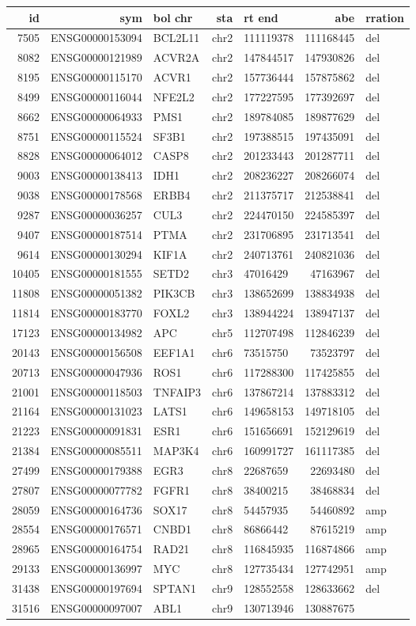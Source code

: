 \documentclass[]{article}
\begin{document}
\begin{longtable}[]{@{}rrlrlrl@{}}
\toprule
id & sym & bol chr & sta & rt end & abe & rration\tabularnewline
\midrule
\endhead
7505 & ENSG00000153094 & BCL2L11 & chr2 & 111119378 & 111168445 &
del\tabularnewline
8082 & ENSG00000121989 & ACVR2A & chr2 & 147844517 & 147930826 &
del\tabularnewline
8195 & ENSG00000115170 & ACVR1 & chr2 & 157736444 & 157875862 &
del\tabularnewline
8499 & ENSG00000116044 & NFE2L2 & chr2 & 177227595 & 177392697 &
del\tabularnewline
8662 & ENSG00000064933 & PMS1 & chr2 & 189784085 & 189877629 &
del\tabularnewline
8751 & ENSG00000115524 & SF3B1 & chr2 & 197388515 & 197435091 &
del\tabularnewline
8828 & ENSG00000064012 & CASP8 & chr2 & 201233443 & 201287711 &
del\tabularnewline
9003 & ENSG00000138413 & IDH1 & chr2 & 208236227 & 208266074 &
del\tabularnewline
9038 & ENSG00000178568 & ERBB4 & chr2 & 211375717 & 212538841 &
del\tabularnewline
9287 & ENSG00000036257 & CUL3 & chr2 & 224470150 & 224585397 &
del\tabularnewline
9407 & ENSG00000187514 & PTMA & chr2 & 231706895 & 231713541 &
del\tabularnewline
9614 & ENSG00000130294 & KIF1A & chr2 & 240713761 & 240821036 &
del\tabularnewline
10405 & ENSG00000181555 & SETD2 & chr3 & 47016429 & 47163967 &
del\tabularnewline
11808 & ENSG00000051382 & PIK3CB & chr3 & 138652699 & 138834938 &
del\tabularnewline
11814 & ENSG00000183770 & FOXL2 & chr3 & 138944224 & 138947137 &
del\tabularnewline
17123 & ENSG00000134982 & APC & chr5 & 112707498 & 112846239 &
del\tabularnewline
20143 & ENSG00000156508 & EEF1A1 & chr6 & 73515750 & 73523797 &
del\tabularnewline
20713 & ENSG00000047936 & ROS1 & chr6 & 117288300 & 117425855 &
del\tabularnewline
21001 & ENSG00000118503 & TNFAIP3 & chr6 & 137867214 & 137883312 &
del\tabularnewline
21164 & ENSG00000131023 & LATS1 & chr6 & 149658153 & 149718105 &
del\tabularnewline
21223 & ENSG00000091831 & ESR1 & chr6 & 151656691 & 152129619 &
del\tabularnewline
21384 & ENSG00000085511 & MAP3K4 & chr6 & 160991727 & 161117385 &
del\tabularnewline
27499 & ENSG00000179388 & EGR3 & chr8 & 22687659 & 22693480 &
del\tabularnewline
27807 & ENSG00000077782 & FGFR1 & chr8 & 38400215 & 38468834 &
del\tabularnewline
28059 & ENSG00000164736 & SOX17 & chr8 & 54457935 & 54460892 &
amp\tabularnewline
28554 & ENSG00000176571 & CNBD1 & chr8 & 86866442 & 87615219 &
amp\tabularnewline
28965 & ENSG00000164754 & RAD21 & chr8 & 116845935 & 116874866 &
amp\tabularnewline
29133 & ENSG00000136997 & MYC & chr8 & 127735434 & 127742951 &
amp\tabularnewline
31438 & ENSG00000197694 & SPTAN1 & chr9 & 128552558 & 128633662 &
del\tabularnewline
31516 & ENSG00000097007 & ABL1 & chr9 & 130713946 & 130887675 &

\end{longtable}
\end{document}
